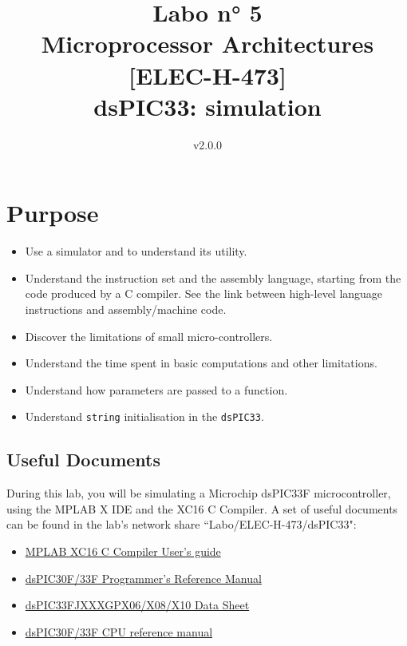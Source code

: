 \documentclass[10pt,a4paper]{article}
\date{\vspace{-1cm}v2.0.0}
\title{\vspace{-2cm} Labo n° 5\\ Microprocessor Architectures [ELEC-H-473]\\ dsPIC33: simulation \ifthenelse{\boolean{corrige}}{~\\Corrigé}{}}
\theoremstyle{definition}%
\newcommand{\kw}[1]{\texttt{#1}}
\begin{document}
\maketitle

\section*{ Purpose}
\begin{itemize}
\item Use a simulator and to understand its utility.
\item Understand the instruction set and the assembly language, starting from the code produced by a C compiler. See the link between high-level language instructions and assembly/machine code.
\item Discover the limitations of small micro-controllers.
\item Understand the time spent in basic computations and other limitations.
\item Understand how parameters are passed to a function.
\item Understand \kw{string} initialisation in the \kw{dsPIC33}.
\end{itemize}


\subsection*{Useful Documents}
During this lab, you will be simulating a Microchip dsPIC33F microcontroller, using the MPLAB X IDE and the XC16 C Compiler.
A set of useful documents can be found in the lab's network share ``Labo/ELEC-H-473/dsPIC33": %
\begin{itemize}
\item \href{http://ww1.microchip.com/downloads/en/DeviceDoc/XC16%20C%20Compiler%20UG%20DS50002071J.pdf}{MPLAB XC16 C Compiler User's guide }
\item \href{http://ww1.microchip.com/downloads/en/DeviceDoc/70157C.pdf}{dsPIC30F/33F Programmer's Reference Manual}
\item \href{http://ww1.microchip.com/downloads/en/DeviceDoc/70286C.pdf}{dsPIC33FJXXXGPX06/X08/X10 Data Sheet}
\item \href{http://ww1.microchip.com/downloads/en/DeviceDoc/70204C.pdf}{dsPIC30F/33F CPU reference manual}
\end{itemize}
\end{document}
